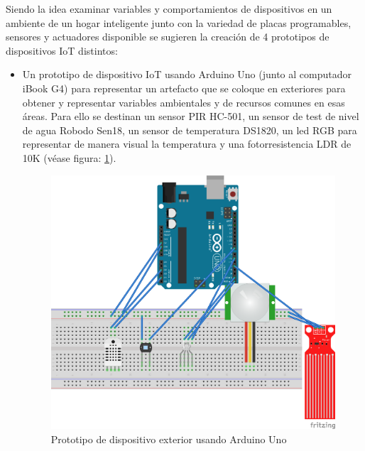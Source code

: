 Siendo la idea examinar variables y comportamientos de dispositivos en un ambiente de un hogar inteligente junto con la variedad de placas programables, sensores y actuadores disponible se sugieren la creación de 4 prototipos de dispositivos IoT distintos:

\begin{itemize}
\item Un prototipo de dispositivo IoT usando Arduino Uno (junto al computador iBook G4) para representar un artefacto que se coloque en exteriores para obtener y representar variables ambientales y de recursos comunes en esas áreas. Para ello se destinan un sensor PIR HC-501, un sensor de test de nivel de agua Robodo Sen18, un sensor de temperatura DS1820, un led RGB para representar de manera visual la temperatura y una fotorresistencia LDR de 10K (véase figura: \ref{fig:arduino1}).
\begin{figure}[htb]
\centering
\includegraphics[scale=0.5]{./Figuras/arduino1.png}
\caption{Prototipo de dispositivo exterior usando Arduino Uno}
\label{fig:arduino1}
\vspace*{-10pt}
\end{figure}


\end{itemize}
